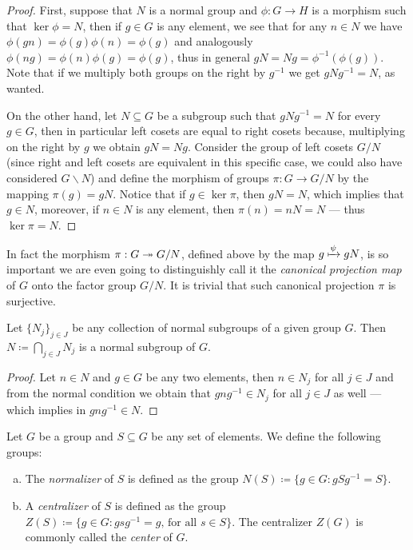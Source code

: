 \begin{proof}
First, suppose that \(N\) is a normal group and \(\phi: G \to H\) is a morphism
such that \(\ker \phi = N\), then if \(g \in G\) is any element, we see that for
any \(n \in N\) we have \(\phi(g n) = \phi(g) \phi(n) = \phi(g)\) and
analogously \(\phi(n g) = \phi(n) \phi(g) = \phi(g)\), thus in general \(g N = N
g = \phi^{-1}(\phi(g))\). Note that if we multiply both groups on the right by
\(g^{-1}\) we get \(g N g^{-1} = N\), as wanted.

On the other hand, let \(N \subseteq G\) be a subgroup such that \(g N g^{-1} =
N\) for every \(g \in G\), then in particular left cosets are equal to right
cosets because, multiplying on the right by \(g\) we obtain \(g N = N
g\). Consider the group of left cosets \(G/N\) (since right and left cosets are
equivalent in this specific case, we could also have considered \(G \backslash
N\)) and define the morphism of groups \(\pi: G \to G/N\) by the mapping
\(\pi(g) = g N\). Notice that if \(g \in \ker \pi\), then \(g N = N\), which
implies that \(g \in N\), moreover, if \(n \in N\) is any element, then
\(\pi(n) = n N = N\) --- thus \(\ker \pi = N\).
\end{proof}

In fact the morphism \(\pi: G \twoheadrightarrow G/N\), defined above by the map \(g \xmapsto
\psi g N\), is so important we are even going to distinguishly call it the
\emph{canonical projection map} of \(G\) onto the factor group \(G/N\). It is
trivial that such canonical projection \(\pi\) is surjective.

\begin{corollary}
\label{cor:intersection-normal-subgroups}
Let \(\{N_{j}\}_{j \in J}\) be any collection of normal subgroups of a given
group \(G\). Then \(N \coloneq \bigcap_{j \in J} N_j\) is a normal subgroup of
\(G\).
\end{corollary}

\begin{proof}
Let \(n \in N\) and \(g \in G\) be any two elements, then \(n \in N_j\) for all
\(j \in J\) and from the normal condition we obtain that \(g n g^{-1} \in N_j\)
for all \(j \in J\) as well --- which implies in \(g n g^{-1} \in N\).
\end{proof}

\begin{definition}
\label{def:normalizer-centralizer}
Let \(G\) be a group and \(S \subseteq G\) be any set of elements. We define the
following groups:
\begin{enumerate}[(a)]\setlength\itemsep{0em}
\item The \emph{normalizer} of \(S\) is defined as the group \(N(S) \coloneq \{g
  \in G : g S g^{-1} = S\}\).
\item A \emph{centralizer} of \(S\) is defined as the group \(Z(S) \coloneq \{g
  \in G : g s g^{-1} = g \text{, for all } s \in S\}\). The centralizer \(Z(G)\)
  is commonly called the \emph{center} of \(G\).
\end{enumerate}
\end{definition}

